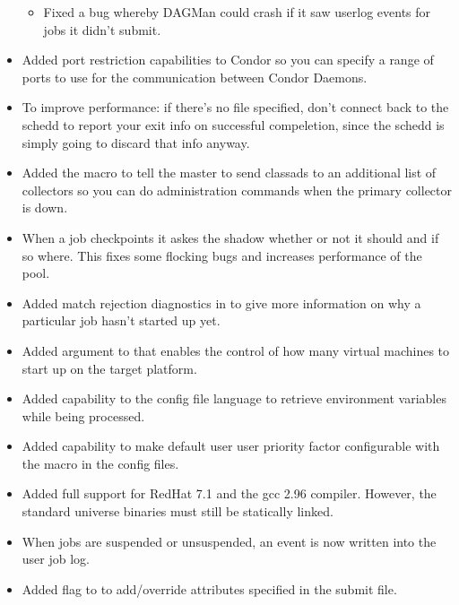 \begin{itemize}
\begin{itemize}
\item
Fixed a bug whereby DAGMan could crash if it saw userlog events for
jobs it didn't submit.

\end{itemize}

\item Added port restriction capabilities to Condor so you can specify a range
of ports to use for the communication between Condor Daemons.

\item To improve performance: if there's no  file
specified, don't connect back to the schedd to report your exit info on
successful compeletion, since the schedd is simply going to discard that
info anyway.

\item Added the macro  to tell the
master to send classads to an additional list of collectors so you can
do administration commands when the primary collector is down.

\item When a job checkpoints it askes the shadow whether or not it
should and if so where. This fixes some flocking bugs and increases
performance of the pool.

\item Added match rejection diagnostics in   to
give more information on why a particular job hasn't started up yet.

\item Added  argument to  that enables the
control of how many virtual machines to start up on the target platform.

\item Added capability to the config file language to retrieve environment
variables while being processed.

\item Added capability to make default user user priority factor configurable
with the  macro in the config files.

\item Added full support for RedHat 7.1 and the gcc 2.96 compiler. However,
the standard universe binaries must still be statically linked.

\item When jobs are suspended or unsuspended, an event is now written into
the user job log.

\item Added  flag to  to add/override attributes
specified in the submit file.


\end{itemize}
